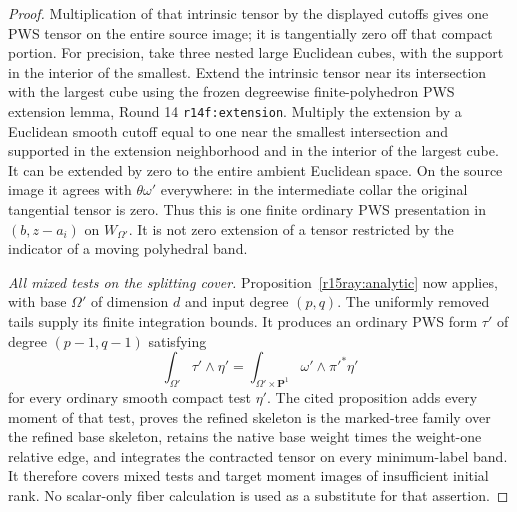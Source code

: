 \begin{proof}
Multiplication of that intrinsic tensor by the displayed cutoffs
gives one PWS tensor on the entire source image; it is tangentially
zero off that compact portion.  For precision, take three nested
large Euclidean cubes, with the support in the interior of the
smallest.  Extend the intrinsic tensor near its intersection with
the largest cube using the frozen degreewise finite-polyhedron
PWS extension lemma, Round 14 \texttt{r14f:extension}.  Multiply
the extension by a Euclidean smooth cutoff equal to one near the
smallest intersection and supported in the extension neighborhood
and in the interior of the largest cube.  It can be extended by
zero to the entire ambient Euclidean space.  On the source image
it agrees with $\theta\omega'$ everywhere: in the intermediate
collar the original tangential tensor is zero.  Thus this is one
finite ordinary PWS presentation in $(b,z-a_i)$ on
$W_{\Omega'}$.  It is not zero extension of a tensor restricted
by the indicator of a moving polyhedral band.

\emph{All mixed tests on the splitting cover.}
Proposition~\ref{r15ray:analytic} now applies, with base
$\Omega'$ of dimension $d$ and input degree $(p,q)$.
The uniformly removed tails supply its finite integration bounds.
It produces an ordinary PWS form $\tau'$ of degree
$(p-1,q-1)$ satisfying
\[
 \int_{\Omega'}\tau'\wedge\eta'
      =\int_{\Omega'\times\mathbf P^1}\omega'
                                                \wedge\pi'^*\eta'
\tag{HP15.9}\label{r15hp:upstairs-pairing}
\]
for every ordinary smooth compact test $\eta'$.
The cited proposition adds every moment of that test, proves the
refined skeleton is the marked-tree family over the refined base
skeleton, retains the native base weight times the weight-one
relative edge, and integrates the contracted tensor on every
minimum-label band.  It therefore covers mixed tests and target
moment images of insufficient initial rank.  No scalar-only
fiber calculation is used as a substitute for that assertion.


\end{proof}
